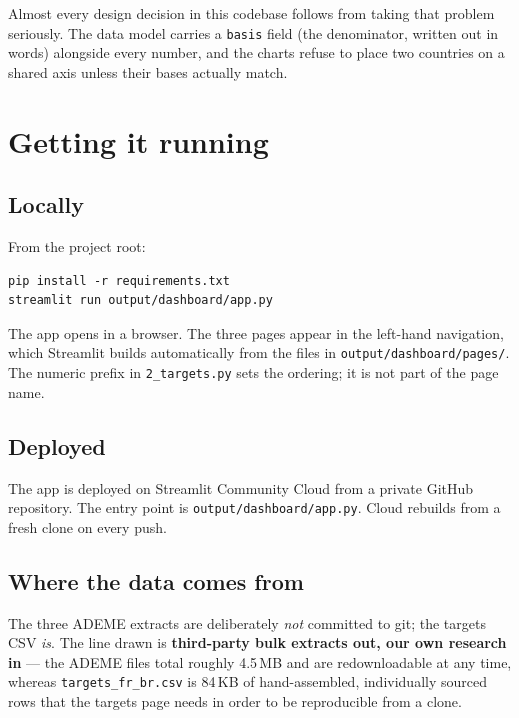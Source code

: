 \documentclass[11pt,a4paper]{article}
\newcommand{\file}[1]{\texttt{#1}}
\begin{document}
Almost every design decision in this codebase follows from taking that problem
seriously. The data model carries a \file{basis} field (the denominator, written
out in words) alongside every number, and the charts refuse to place two
countries on a shared axis unless their bases actually match.

\section{Getting it running}\label{sec:run}

\subsection{Locally}

From the project root:

\begin{lstlisting}[style=sh]
pip install -r requirements.txt
streamlit run output/dashboard/app.py
\end{lstlisting}

The app opens in a browser. The three pages appear in the left-hand navigation,
which Streamlit builds automatically from the files in
\file{output/dashboard/pages/}. The numeric prefix in \file{2\_targets.py} sets
the ordering; it is not part of the page name.

\subsection{Deployed}

The app is deployed on Streamlit Community Cloud from a private GitHub
repository. The entry point is \file{output/dashboard/app.py}. Cloud rebuilds
from a fresh clone on every push.

\subsection{Where the data comes from}\label{sec:sources}

The three ADEME extracts are deliberately \emph{not} committed to git; the
targets CSV \emph{is}. The line drawn is \textbf{third-party bulk extracts out,
our own research in} --- the ADEME files total roughly 4.5\,MB and are
redownloadable at any time, whereas \file{targets\_fr\_br.csv} is 84\,KB of
hand-assembled, individually sourced rows that the targets page needs in order
to be reproducible from a clone.
\end{document}
